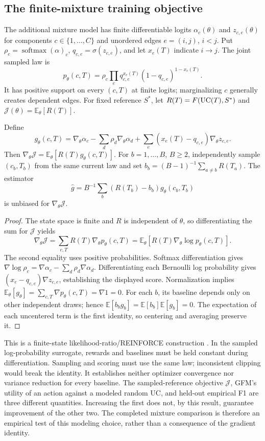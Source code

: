 \subsection{The finite-mixture training objective}\label{app:mixture-score-identity}
The additional mixture model has finite differentiable logits $\alpha_c(\theta)$ and $z_{c,e}(\theta)$ for components $c\in\{1,\ldots,C\}$ and unordered edges $e=(i,j)$, $i<j$. Put $\rho_c=\operatorname{softmax}(\alpha)_c$, $q_{c,e}=\sigma(z_{c,e})$, and let $x_e(T)$ indicate $i\to j$. The joint sampled law is
\[
p_\theta(c,T)=\rho_c\prod_e q_{c,e}^{x_e(T)}(1-q_{c,e})^{1-x_e(T)}.
\]
It has positive support on every $(c,T)$ at finite logits; marginalizing $c$ generally creates dependent edges. For fixed reference $S^*$, let $R(T)=F(\mathrm{UC}(T),S^*)$ and $\mathcal J(\theta)=\mathbb E_\theta[R(T)]$.

\begin{proposition}\label{prop:mixture-score-identity}
Define
\[
g_\theta(c,T)=\nabla_\theta\alpha_c-\sum_d\rho_d\nabla_\theta\alpha_d
+\sum_e(x_e(T)-q_{c,e})\nabla_\theta z_{c,e}.
\]
Then $\nabla_\theta\mathcal J=\mathbb E_\theta[R(T)g_\theta(c,T)]$. For $b=1,\ldots,B$, $B\ge2$, independently sample $(c_b,T_b)$ from the same current law and set $b_b=(B-1)^{-1}\sum_{a\ne b}R(T_a)$. The estimator
\[
\widehat g=B^{-1}\sum_b(R(T_b)-b_b)g_\theta(c_b,T_b)
\]
is unbiased for $\nabla_\theta\mathcal J$.
\end{proposition}
\begin{proof}
The state space is finite and $R$ is independent of $\theta$, so differentiating the sum for $\mathcal J$ yields
\[
\nabla_\theta\mathcal J
=\sum_{c,T}R(T)\nabla_\theta p_\theta(c,T)
=\mathbb E_\theta[R(T)\nabla_\theta\log p_\theta(c,T)].
\]
The second equality uses positive probabilities. Softmax differentiation gives $\nabla\log\rho_c=\nabla\alpha_c-\sum_d\rho_d\nabla\alpha_d$. Differentiating each Bernoulli log probability gives $(x_e-q_{c,e})\nabla z_{c,e}$, establishing the displayed score. Normalization implies $\mathbb E_\theta[g_\theta]=\sum_{c,T}\nabla p_\theta(c,T)=\nabla1=0$. For each $b$, its baseline depends only on other independent draws; hence $\mathbb E[b_bg_b]=\mathbb E[b_b]\mathbb E[g_b]=0$. The expectation of each uncentered term is the first identity, so centering and averaging preserve it.
\end{proof}
This is a finite-state likelihood-ratio/REINFORCE construction \citep{williams1992reinforce}. In the sampled log-probability surrogate, rewards and baselines must be held constant during differentiation. Sampling and scoring must use the same law; inconsistent clipping would break the identity. It establishes neither optimizer convergence nor variance reduction for every baseline. The sampled-reference objective $\mathcal J$, GFM's utility of an action against a modeled random UC, and held-out empirical F1 are three different quantities. Increasing the first does not, by this result, guarantee improvement of the other two. The completed mixture comparison is therefore an empirical test of this modeling choice, rather than a consequence of the gradient identity.
